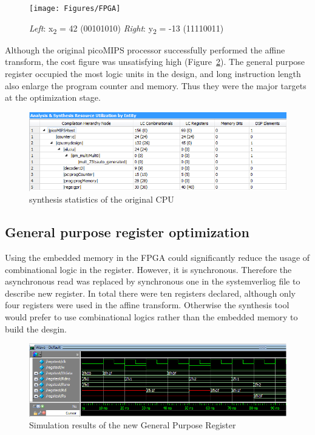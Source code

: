 \begin{figure}[H]
		\centering
		\texttt{[image: Figures/FPGA]}		
		\caption{\textit{Left}: x\textsubscript{2} = 42 (00101010) \textit{Right}: y\textsubscript{2} = -13 (11110011)}
		\label {fig:fpga}
\end{figure}

Although the original picoMIPS processor successfully performed the affine transform, the cost figure was unsatisfying high (Figure~\ref{fig:cputest}). The general purpose register occupied the most logic units in the design, and long instruction length also enlarge the program counter and memory. Thus they were the major targets at the optimization stage.

\begin{figure}[H]
		\centering
		\includegraphics[width = \textwidth]{Figures/ocpucost}		
		\caption{synthesis statistics of the original CPU}
		\label {fig:cputest}
\end{figure}

\subsection{General purpose register optimization}

Using the embedded memory in the FPGA could significantly reduce the usage of combinational logic in the register. However, it is synchronous. Therefore the asynchronous read was replaced by synchronous one in the systemverliog file to describe new register. In total there were ten registers declared, although only four registers were used in the affine transform. Otherwise the synthesis tool would prefer to use combinational logics rather than the embedded memory to build the desgin. 

\begin{figure}[H]
		\centering
		\includegraphics[width = \textwidth]{Figures/newGPR}		
		\caption{Simulation results of the new General Purpose Register}
		\label {fig:newGPRtest}
\end{figure}

